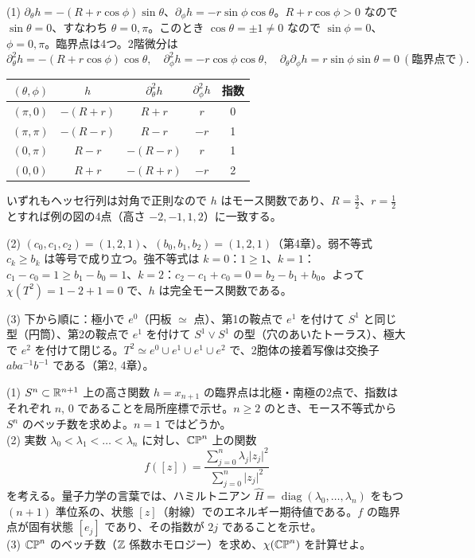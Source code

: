 \begin{solution}
(1) $\partial_\theta h=-(R+r\cos\phi)\sin\theta$、$\partial_\phi h=-r\sin\phi\cos\theta$。$R+r\cos\phi>0$ なので $\sin\theta=0$、すなわち $\theta=0,\pi$。このとき $\cos\theta=\pm1\neq0$ なので $\sin\phi=0$、$\phi=0,\pi$。臨界点は4つ。2階微分は
\[
\partial_\theta^2h=-(R+r\cos\phi)\cos\theta,\quad \partial_\phi^2h=-r\cos\phi\cos\theta,\quad \partial_\theta\partial_\phi h=r\sin\phi\sin\theta=0\ (\text{臨界点で}).
\]
\begin{center}
\begin{tabular}{c|c|cc|c}
$(\theta,\phi)$ & $h$ & $\partial_\theta^2h$ & $\partial_\phi^2h$ & 指数\\ \hline
$(\pi,0)$ & $-(R+r)$ & $R+r$ & $r$ & 0\\
$(\pi,\pi)$ & $-(R-r)$ & $R-r$ & $-r$ & 1\\
$(0,\pi)$ & $R-r$ & $-(R-r)$ & $r$ & 1\\
$(0,0)$ & $R+r$ & $-(R+r)$ & $-r$ & 2
\end{tabular}
\end{center}
いずれもヘッセ行列は対角で正則なので $h$ はモース関数であり、$R=\tfrac32$、$r=\tfrac12$ とすれば例の図の4点（高さ $-2,-1,1,2$）に一致する。

(2) $(c_0,c_1,c_2)=(1,2,1)$、$(b_0,b_1,b_2)=(1,2,1)$（第4章）。弱不等式 $c_k\ge b_k$ は等号で成り立つ。強不等式は $k=0$：$1\ge1$、$k=1$：$c_1-c_0=1\ge b_1-b_0=1$、$k=2$：$c_2-c_1+c_0=0=b_2-b_1+b_0$。よって $\chi(T^2)=1-2+1=0$ で、$h$ は完全モース関数である。

(3) 下から順に：極小で $e^0$（円板 $\simeq$ 点）、第1の鞍点で $e^1$ を付けて $S^1$ と同じ型（円筒）、第2の鞍点で $e^1$ を付けて $S^1\vee S^1$ の型（穴のあいたトーラス）、極大で $e^2$ を付けて閉じる。$T^2\simeq e^0\cup e^1\cup e^1\cup e^2$ で、2胞体の接着写像は交換子 $aba^{-1}b^{-1}$ である（第2, 4章）。
\end{solution}

\begin{problem}[難易度 B]\label{ch11-prob-cpn}
(1) $S^n\subset\mathbb{R}^{n+1}$ 上の高さ関数 $h=x_{n+1}$ の臨界点は北極・南極の2点で、指数はそれぞれ $n$, $0$ であることを局所座標で示せ。$n\ge2$ のとき、モース不等式から $S^n$ のベッチ数を求めよ。$n=1$ ではどうか。\\
(2) 実数 $\lambda_0<\lambda_1<\dots<\lambda_n$ に対し、$\mathbb{CP}^n$ 上の関数
\[
f([z])=\frac{\sum_{j=0}^n\lambda_j\lvert z_j\rvert^2}{\sum_{j=0}^n\lvert z_j\rvert^2}
\]
を考える。量子力学の言葉では、ハミルトニアン $\hat H=\operatorname{diag}(\lambda_0,\dots,\lambda_n)$ をもつ $(n+1)$ 準位系の、状態 $[z]$（射線）でのエネルギー期待値である。$f$ の臨界点が固有状態 $[e_j]$ であり、その指数が $2j$ であることを示せ。\\
(3) $\mathbb{CP}^n$ のベッチ数（$\mathbb{Z}$ 係数ホモロジー）を求め、$\chi(\mathbb{CP}^n)$ を計算せよ。
\end{problem}

